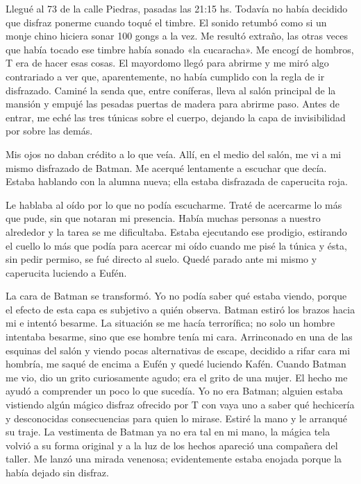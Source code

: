 \documentclass[11pt,twoside,openright,a5paper]{book}
\begin{document}
Llegué al 73 de la calle Piedras, pasadas las 21:15 hs. Todavía no había decidido que disfraz ponerme cuando toqué el timbre. El sonido retumbó como si un monje chino hiciera sonar 100 gongs a la vez. Me resultó extraño, las otras veces que había tocado ese timbre había sonado «la cucaracha». Me encogí de hombros, T era de hacer esas cosas. El mayordomo llegó para abrirme y me miró algo contrariado a ver que, aparentemente, no había cumplido con la regla de ir disfrazado. Caminé la senda que, entre coníferas, lleva al salón principal de la mansión y empujé las pesadas puertas de madera para abrirme paso. Antes de entrar, me eché las tres túnicas sobre el cuerpo, dejando la capa de invisibilidad por sobre las demás. 

Mis ojos no daban crédito a lo que veía. Allí, en el medio del salón, me vi a mi mismo disfrazado de Batman. Me acerqué lentamente a escuchar que decía. Estaba hablando con la alumna nueva; ella estaba disfrazada de caperucita roja.

Le hablaba al oído por lo que no podía escucharme. Traté de acercarme lo más que pude, sin que notaran mi presencia. Había muchas personas a nuestro alrededor y la tarea se me dificultaba. Estaba ejecutando ese prodigio, estirando el cuello lo más que podía para acercar mi oído cuando me pisé la túnica y ésta, sin pedir permiso, se fué directo al suelo. Quedé parado ante mi mismo y caperucita luciendo a Eufén.

La cara de Batman se transformó. Yo no podía saber qué estaba viendo, porque el efecto de esta capa es subjetivo a quién observa. Batman estiró los brazos hacia mi e intentó besarme. La situación se me hacía terrorífica; no solo un hombre intentaba besarme, sino que ese hombre tenía mi cara. Arrinconado en una de las esquinas del salón y viendo pocas alternativas de escape, decidido a rifar cara mi hombría, me saqué de encima a Eufén y quedé luciendo Kafén. Cuando Batman me vio, dio un grito curiosamente agudo; era el grito de una mujer. El hecho me ayudó a comprender un poco lo que sucedía. Yo no era Batman; alguien estaba vistiendo algún mágico disfraz ofrecido por T con vaya uno a saber qué hechicería y desconocidas consecuencias para quien lo mirase. Estiré la mano y le arranqué su traje. La vestimenta de Batman ya no era tal en mi mano, la mágica tela volvió a su forma original y a la luz de los hechos apareció una compañera del taller. Me lanzó una mirada venenosa; evidentemente estaba enojada porque la había dejado sin disfraz.
\end{document}
